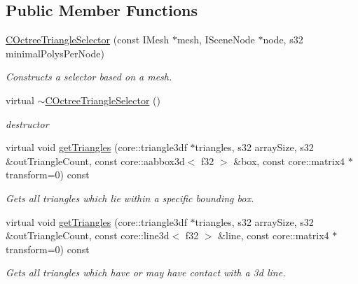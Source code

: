 \subsection*{Public Member Functions}
\begin{DoxyCompactItemize}
\item 
\hyperlink{classirr_1_1scene_1_1_c_octree_triangle_selector_a5d9efa920fd05f375b257b48e8b00c10}{C\-Octree\-Triangle\-Selector} (const I\-Mesh $\ast$mesh, I\-Scene\-Node $\ast$node, s32 minimal\-Polys\-Per\-Node)
\begin{DoxyCompactList}\small\item\em Constructs a selector based on a mesh. \end{DoxyCompactList}\item 
\hypertarget{classirr_1_1scene_1_1_c_octree_triangle_selector_a5f730c867d0d7d57db3949a9908748c1}{virtual \hyperlink{classirr_1_1scene_1_1_c_octree_triangle_selector_a5f730c867d0d7d57db3949a9908748c1}{$\sim$\-C\-Octree\-Triangle\-Selector} ()}\label{classirr_1_1scene_1_1_c_octree_triangle_selector_a5f730c867d0d7d57db3949a9908748c1}

\begin{DoxyCompactList}\small\item\em destructor \end{DoxyCompactList}\item 
\hypertarget{classirr_1_1scene_1_1_c_octree_triangle_selector_a90c6830e6c2ad176484fe06f936223d2}{virtual void \hyperlink{classirr_1_1scene_1_1_c_octree_triangle_selector_a90c6830e6c2ad176484fe06f936223d2}{get\-Triangles} (core\-::triangle3df $\ast$triangles, s32 array\-Size, s32 \&out\-Triangle\-Count, const core\-::aabbox3d$<$ f32 $>$ \&box, const core\-::matrix4 $\ast$transform=0) const }\label{classirr_1_1scene_1_1_c_octree_triangle_selector_a90c6830e6c2ad176484fe06f936223d2}

\begin{DoxyCompactList}\small\item\em Gets all triangles which lie within a specific bounding box. \end{DoxyCompactList}\item 
\hypertarget{classirr_1_1scene_1_1_c_octree_triangle_selector_a0ae76089cebee4432f5af42d0df7cc4c}{virtual void \hyperlink{classirr_1_1scene_1_1_c_octree_triangle_selector_a0ae76089cebee4432f5af42d0df7cc4c}{get\-Triangles} (core\-::triangle3df $\ast$triangles, s32 array\-Size, s32 \&out\-Triangle\-Count, const core\-::line3d$<$ f32 $>$ \&line, const core\-::matrix4 $\ast$transform=0) const }\label{classirr_1_1scene_1_1_c_octree_triangle_selector_a0ae76089cebee4432f5af42d0df7cc4c}

\begin{DoxyCompactList}\small\item\em Gets all triangles which have or may have contact with a 3d line. \end{DoxyCompactList}\end{DoxyCompactItemize}
